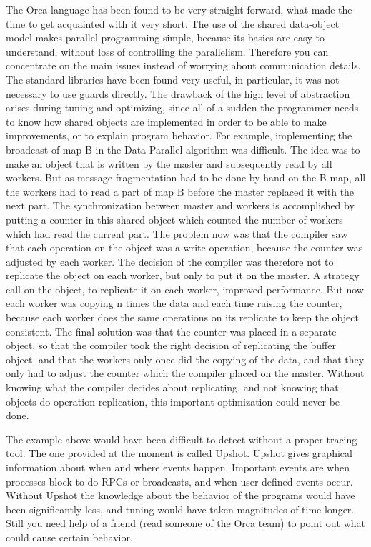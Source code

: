 The Orca language has been found to be very straight forward, what
made the time to get acquainted with it very short.
The use of the shared data-object model makes parallel programming
simple, because its basics are easy to understand, without loss
of controlling the parallelism.
Therefore you can concentrate on the main issues instead of worrying
about communication details.
The standard libraries have been found very useful, in particular, it
was not necessary to use guards directly.
The drawback of the high level of abstraction arises during tuning
and optimizing, since all of a sudden the programmer needs to know
how shared objects are implemented in order to be able to make
improvements, or to explain program behavior.
For example, implementing the broadcast of map B in the Data
Parallel algorithm was difficult. 
The idea was to make an object that is written by the master and
subsequently read by all workers.
But as message fragmentation had to be done by hand on the B map, all the
workers had to read a part of map B before the master replaced it with
the next part.
The synchronization between master and workers is accomplished by
putting a counter in this shared object which counted the number of
workers which had read the current part.
The problem now was that the compiler saw that each operation on the
object was a write operation, because the counter was adjusted by
each worker.
The decision of the compiler was therefore not to replicate the
object on each worker, but only to put it on the master.
A strategy call on the object, to replicate it on each worker,
improved performance.
But now each worker was copying n times the data and each time raising
the counter, because each worker does the same operations on its
replicate to keep the object consistent.
The final solution was that the counter was placed in a separate
object, so that the compiler took the right decision of replicating
the buffer object, and that the workers only once did the copying of
the data, and that they only had to adjust the counter which the compiler
placed on the master.
Without knowing what the compiler decides about replicating, and not
knowing that objects do operation replication, this important optimization
could never be done.

The example above would have been difficult to detect without a proper
tracing tool.
The one provided at the moment is called Upshot.
Upshot gives graphical information about when and where events happen.
Important events are when processes block to do RPCs or broadcasts, and
when user defined events occur.
Without Upshot the knowledge about the behavior of the programs would
have been significantly less, and tuning would have taken
magnitudes of time longer.
Still you need help of a friend (read someone of the Orca team) to
point out what could cause certain behavior.

